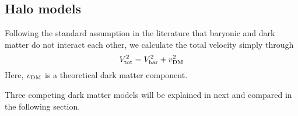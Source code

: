 \subsection{Halo models}
Following the standard assumption in the literature that baryonic and dark matter do not interact each other, we calculate the total velocity simply through \begin{equation}
	\label{eqn:baryonic-diff}
	\SYMvtot^2 = \SYMvbar^2 + \SYMvDM^2
\end{equation} Here, $v_\mathrm{DM}$ is a theoretical dark matter component.
%
%

Three competing dark matter models will be explained in next and compared in the following section.

